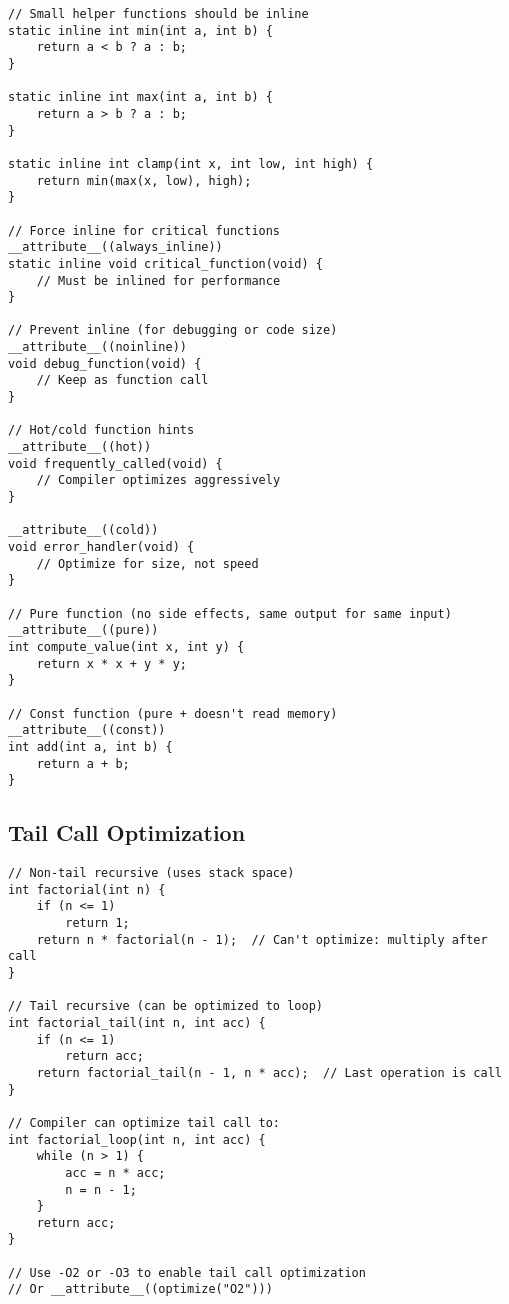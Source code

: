 \begin{lstlisting}
// Small helper functions should be inline
static inline int min(int a, int b) {
    return a < b ? a : b;
}

static inline int max(int a, int b) {
    return a > b ? a : b;
}

static inline int clamp(int x, int low, int high) {
    return min(max(x, low), high);
}

// Force inline for critical functions
__attribute__((always_inline))
static inline void critical_function(void) {
    // Must be inlined for performance
}

// Prevent inline (for debugging or code size)
__attribute__((noinline))
void debug_function(void) {
    // Keep as function call
}

// Hot/cold function hints
__attribute__((hot))
void frequently_called(void) {
    // Compiler optimizes aggressively
}

__attribute__((cold))
void error_handler(void) {
    // Optimize for size, not speed
}

// Pure function (no side effects, same output for same input)
__attribute__((pure))
int compute_value(int x, int y) {
    return x * x + y * y;
}

// Const function (pure + doesn't read memory)
__attribute__((const))
int add(int a, int b) {
    return a + b;
}
\end{lstlisting}

\subsection{Tail Call Optimization}

\begin{lstlisting}
// Non-tail recursive (uses stack space)
int factorial(int n) {
    if (n <= 1)
        return 1;
    return n * factorial(n - 1);  // Can't optimize: multiply after call
}

// Tail recursive (can be optimized to loop)
int factorial_tail(int n, int acc) {
    if (n <= 1)
        return acc;
    return factorial_tail(n - 1, n * acc);  // Last operation is call
}

// Compiler can optimize tail call to:
int factorial_loop(int n, int acc) {
    while (n > 1) {
        acc = n * acc;
        n = n - 1;
    }
    return acc;
}

// Use -O2 or -O3 to enable tail call optimization
// Or __attribute__((optimize("O2")))
\end{lstlisting}

